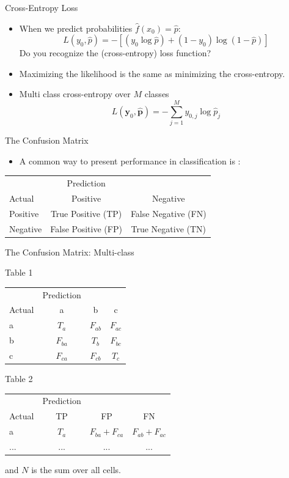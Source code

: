 \documentclass[10pt]{beamer}
\begin{document}
\begin{frame}{Cross-Entropy Loss}

\begin{itemize}
\item When we predict probabilities $\hat{f}(x_0)=\hat{p}$:
\[
L(y_0, \hat{p}) = - [ (y_0 \log{\hat{p}}) + (1 - y_0) \log{(1- \hat{p})} ]
\]
 Do you recognize the (cross-entropy) loss function?
\pause
\item Maximizing the likelihood is the same as minimizing the cross-entropy. \pause
\item Multi class cross-entropy over $M$ classes
\[
L(\mathbf{y}_0, \hat{\mathbf{p}}) = - \sum^M_{j=1} y_{0,j} \log{\hat{p}_j}
\]
\end{itemize}

\end{frame}


\begin{frame}{The Confusion Matrix}

\begin{itemize}
\item A common way to present performance in classification is :
\end{itemize}
\centering
\begin{tabular}{lcc}
  & Prediction &  \\
  Actual & Positive & Negative \\
  Positive & True Positive (TP) & False Negative (FN) \\
  Negative & False Positive (FP) & True Negative (TN)
\end{tabular}


\end{frame}

\begin{frame}{The Confusion Matrix: Multi-class}


\centering
Table 1

\begin{tabular}{lccc}
  & Prediction &  \\
  Actual & a & b & c \\
  a & $T_a$ & $F_{ab}$ & $F_{ac}$ \\
  b & $F_{ba}$ & $T_b$ & $F_{bc}$ \\
  c & $F_{ca}$ & $F_{cb}$ & $T_c$ \\
\end{tabular}



Table 2

\centering
\begin{tabular}{lccc}
  & Prediction &  \\
  Actual & TP & FP & FN \\
  a & $T_a$ & $F_{ba} + F_{ca}$ & $F_{ab} + F_{ac}$ \\
  ... & ... & ... & ...
\end{tabular}

and $N$ is the sum over all cells.



\end{frame}
\end{document}
